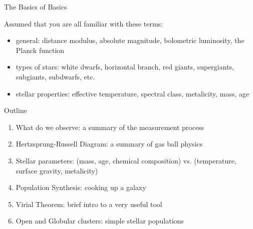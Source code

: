 \documentclass[letterpaper,landscape]{slides}
\begin{document}
\begin{slide}
\begin{center}
{\large \color{red} 
                                The Basics of Basics
}
\end{center}


{\color{blue} Assumed that you are all familiar with these terms:}

\begin{itemize}
\item {\color{blue}general:} distance modulus, absolute magnitude, 
                             bolometric luminosity, the Planck function
\item {\color{blue}types of stars:} white dwarfs, horizontal branch, 
                           red giants, supergiants, subgiants, subdwarfs, etc.
\item {\color{blue}stellar properties:} effective temperature, spectral class, 
                           metalicity, mass, age 
\end{itemize}     
     
\vfill
\end{slide}



\begin{slide}
\begin{center}
{\large \color{red} 
                                      Outline
}
\end{center}

\begin{enumerate}
\item {\color{blue} What do we observe:} a summary of the measurement process
\item {\color{blue} Hertzsprung-Russell Diagram:} a summary of gas ball physics
\item {\color{blue} Stellar parameters:} (mass, age, chemical composition) vs. 
(temperature, surface gravity, metalicity)
\item {\color{blue} Population Synthesis:} cooking up a galaxy
\item {\color{blue} Virial Theorem:} brief intro to a very useful tool
\item {\color{blue} Open and Globular clusters:} simple stellar populations 
\end{enumerate}          
\vfill
\end{slide}
\end{document}
